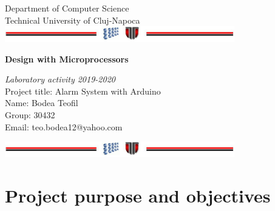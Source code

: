 \documentclass[a4paper,12pt]{report}
\begin{document}
\vspace{-5cm}
\begin{center}
Department of Computer Science\\
Technical University of Cluj-Napoca\\
\includegraphics[width=10cm]{fig/footer}
\end{center}
\vspace{1cm}
\begin{center}
\begin{Large}

\textbf{Design with Microprocessors}\\
\end{Large}
\textit{Laboratory activity 2019-2020}\\
\vspace{3cm}
Project title: Alarm System with Arduino\\

\vspace{1.5cm}
Name: Bodea Teofil\\
Group: 30432\\
Email: teo.bodea12@yahoo.com\\
\vspace{6cm}

\vspace{1cm}
\includegraphics[width=10cm]{fig/footer}
\end{center}

\tableofcontents

\chapter{Project purpose and objectives}

\colorbox{blue!20}{}
\end{document}
